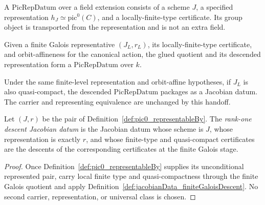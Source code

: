 \begin{definition}
  \label{def:picRepDatum}
  \leanok
  A \(\mathrm{PicRepDatum}\) over a field extension consists of a scheme \(J\), a specified
  representation \(h_J\simeq\mathrm{pic}^0(C)\), and a locally-finite-type certificate.  Its
  group object is transported from the representation and is not an extra field.
\end{definition}

\begin{definition}
  \label{def:picRepDatum_finiteGaloisDescent}
  \leanok
  Given a finite Galois representative \((J_L,r_L)\), its locally-finite-type certificate,
  and orbit-affineness for the canonical action, the glued quotient and its descended
  representation form a \(\mathrm{PicRepDatum}\) over \(k\).
\end{definition}

\begin{definition}
  \label{def:jacobianData_finiteGaloisDescent}
  \leanok
  Under the same finite-level representation and orbit-affine hypotheses, if \(J_L\) is also
  quasi-compact, the descended \(\mathrm{PicRepDatum}\) packages as a Jacobian datum.  The
  carrier and representing equivalence are unchanged by this handoff.
\end{definition}

\begin{definition}
  \label{def:jacobianData}
  \notready
  Let \((J,r)\) be the pair of
  Definition~\ref{def:pic0_representableBy}.  The \emph{rank-one descent Jacobian datum} is
  the Jacobian datum whose scheme is \(J\), whose representation is exactly \(r\), and whose
  finite-type and quasi-compact certificates are the descents of the corresponding
  certificates at the finite Galois stage.
\end{definition}
\begin{proof}
  Once Definition~\ref{def:pic0_representableBy} supplies its unconditional represented pair,
  carry local finite type and quasi-compactness through the finite Galois quotient and apply
  Definition~\ref{def:jacobianData_finiteGaloisDescent}.  No second carrier, representation,
  or universal class is chosen.
\end{proof}
